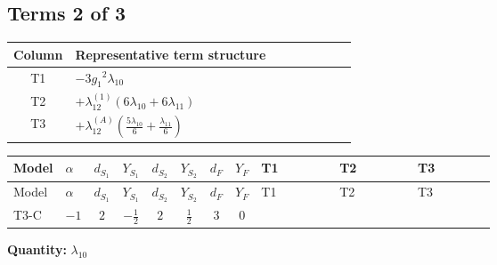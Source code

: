 \documentclass[8pt]{article}
\begin{document}
\begin{landscape}
\subsection*{Terms 2 of 3}
\begin{center}
\begin{tabular}{@{}c >{\raggedright\arraybackslash}p{0.82\linewidth}@{}}
\toprule
Column & Representative term structure \\
\midrule
T1 & \(\displaystyle -3 {g_1}^2 {\lambda_{10}}\) \\
\midrule
T2 & \(\displaystyle +{\lambda_{12}^{(1)}} (6 {\lambda_{10}}+6 {\lambda_{11}})\) \\
\midrule
T3 & \(\displaystyle +{\lambda_{12}^{(A)}} \left(\frac{5 {\lambda_{10}}}{6}+\frac{{\lambda_{11}}}{6}\right)\) \\
\midrule
\bottomrule
\end{tabular}
\end{center}
\smallskip
\tiny
\begin{longtable}{@{}llcccccc >{\raggedright\arraybackslash}p{0.21\linewidth} >{\raggedright\arraybackslash}p{0.21\linewidth} >{\raggedright\arraybackslash}p{0.21\linewidth}@{}}
\toprule
Model & $\alpha$ & $d_{S_1}$ & $Y_{S_1}$ & $d_{S_2}$ & $Y_{S_2}$ & $d_F$ & $Y_F$ & T1 & T2 & T3 \\
\midrule
\endfirsthead
\toprule
Model & $\alpha$ & $d_{S_1}$ & $Y_{S_1}$ & $d_{S_2}$ & $Y_{S_2}$ & $d_F$ & $Y_F$ & T1 & T2 & T3 \\
\midrule
\endhead
T3-C & $-1$ & $2$ & $-\frac{1}{2}$ & $2$ & $\frac{1}{2}$ & $3$ & $0$ & \scriptsize\adjustbox{max width=\linewidth}{$\begin{gathered} -3 {g_1}^2 {\lambda_{10}}\end{gathered}$} & \scriptsize\adjustbox{max width=\linewidth}{$\begin{gathered} +{\lambda_{12}^{(1)}} (6 {\lambda_{10}}+6 {\lambda_{11}})\end{gathered}$} & \scriptsize\adjustbox{max width=\linewidth}{$\begin{gathered} +{\lambda_{12}^{(A)}} \left(\frac{5 {\lambda_{10}}}{6}+\frac{{\lambda_{11}}}{6}\right)\end{gathered}$} \\
\midrule
\bottomrule
\end{longtable}
\clearpage
\noindent\textbf{Quantity: }$\lambda_{10}$\par\smallskip

\end{landscape}
\end{document}
